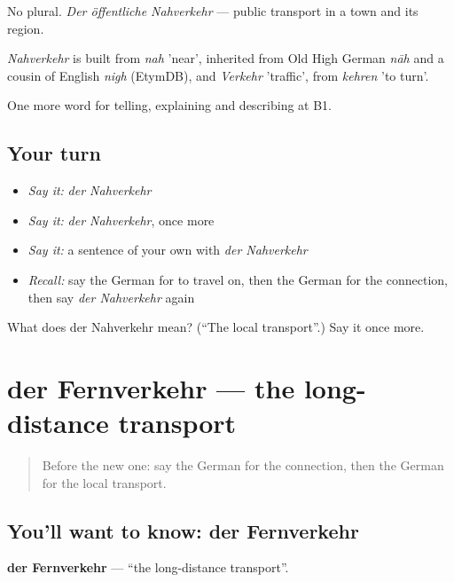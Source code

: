 No plural. \emph{Der öffentliche Nahverkehr} — public transport in a town and its region.

\begin{cousinweb}
\emph{Nahverkehr} is built from \emph{nah} 'near', inherited from Old High German \emph{nāh} and a cousin of English \emph{nigh} (EtymDB), and \emph{Verkehr} 'traffic', from \emph{kehren} 'to turn'.
\end{cousinweb}

\begin{grammarlens}[title={What you've built}]
One more word for telling, explaining and describing at B1.
\end{grammarlens}

\subsection*{Your turn}
\begin{itemize}
\raggedright
  \item \emph{Say it:} \emph{der Nahverkehr}
  \item \emph{Say it:} \emph{der Nahverkehr}, once more
  \item \emph{Say it:} a sentence of your own with \emph{der Nahverkehr}
  \item \emph{Recall:} say the German for to travel on, then the German for the connection, then say \emph{der Nahverkehr} again
\end{itemize}

\begin{tcolorbox}[breakable,colback=teal!4,colframe=teal!35!black,title={Before you move on}]
What does der Nahverkehr mean? (\textquotedblleft{}The local transport\textquotedblright{}.) Say it once more.
\end{tcolorbox}
\section[der Fernverkehr]{der Fernverkehr — the long-distance transport}

\label{lesson:GE-C414-fernverkehr}



\begin{quote}
Before the new one: say the German for the connection, then the German for the local transport.
\end{quote}

\subsection*{You'll want to know: der Fernverkehr}
\textbf{der Fernverkehr} — \textquotedblleft{}the long-distance transport\textquotedblright{}.

